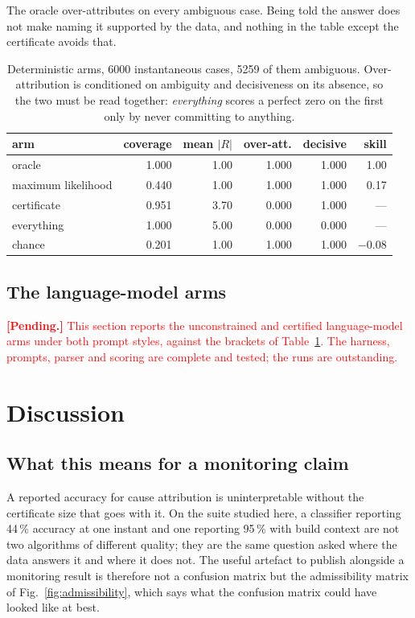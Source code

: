 \documentclass[preprint,12pt]{elsarticle}
\begin{document}
The oracle over-attributes on every ambiguous case. Being told the answer does
not make naming it supported by the data, and nothing in the table except the
certificate avoids that.

\begin{table}[htbp]
\centering
\caption{Deterministic arms, 6000 instantaneous cases, 5259 of them ambiguous.
Over-attribution is conditioned on ambiguity and decisiveness on its absence, so
the two must be read together: \emph{everything} scores a perfect zero on the
first only by never committing to anything.}
\label{tab:arms}
\begin{tabular}{@{}lrrrrr@{}}
\toprule
arm & coverage & mean $|R|$ & over-att. & decisive & skill \\
\midrule
oracle             & 1.000 & 1.00 & 1.000 & 1.000 & 1.00 \\
maximum likelihood & 0.440 & 1.00 & 1.000 & 1.000 & 0.17 \\
certificate        & 0.951 & 3.70 & 0.000 & 1.000 & --- \\
everything         & 1.000 & 5.00 & 0.000 & 0.000 & --- \\
chance             & 0.201 & 1.00 & 1.000 & 1.000 & $-0.08$ \\
\bottomrule
\end{tabular}
\end{table}

\subsection{The language-model arms}
\label{sec:llm}

\textcolor{red}{\textbf{[Pending.]} This section reports the unconstrained and
certified language-model arms under both prompt styles, against the brackets of
Table~\ref{tab:arms}. The harness, prompts, parser and scoring are complete and
tested; the runs are outstanding.}

\section{Discussion}
\label{sec:discussion}

\subsection{What this means for a monitoring claim}

A reported accuracy for cause attribution is uninterpretable without the
certificate size that goes with it. On the suite studied here, a classifier
reporting 44\,\% accuracy at one instant and one reporting 95\,\% with build
context are not two algorithms of different quality; they are the same question
asked where the data answers it and where it does not. The useful artefact to
publish alongside a monitoring result is therefore not a confusion matrix but
the admissibility matrix of Fig.~\ref{fig:admissibility}, which says what the
confusion matrix could have looked like at best.
\end{document}
